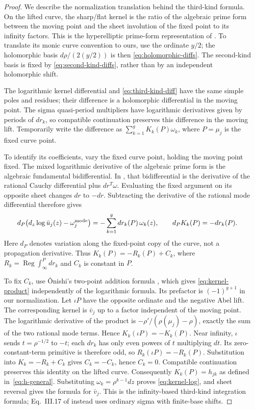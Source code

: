 \documentclass[11pt]{article}
\newcommand{\Reg}{\operatorname{Reg}}
\begin{document}
\begin{proof}
We describe the normalization translation behind the third-kind formula. On the lifted curve, the sharp/flat kernel is the ratio of the algebraic prime form between the moving point and the sheet involution of the fixed point to its infinity factors. This is the hyperelliptic prime-form representation of \cite[Theorem~7.17]{primeform}. To translate its monic curve convention to ours, use the ordinate $y/2$; the holomorphic basis $d\rho/(2(y/2))$ is then \eqref{eq:holomorphic-diffs}. The second-kind basis is fixed by \eqref{eq:second-kind-diffs}, rather than by an independent holomorphic shift.

The logarithmic kernel differential and \eqref{eq:third-kind-diff} have the same simple poles and residues; their difference is a holomorphic differential in the moving point. The sigma quasi-period multipliers have logarithmic derivatives given by periods of $dr_k$, so compatible continuation preserves this difference in the moving lift. Temporarily write the difference as $\sum_{k=1}^{g} K_k(P)\omega_k$, where $P=\mu_j$ is the fixed curve point.

To identify its coefficients, vary the fixed curve point, holding the moving point fixed. The mixed logarithmic derivative of the algebraic prime form is the algebraic fundamental bidifferential. In \cite[Eq.~II.11]{thirdkind}, that bidifferential is the derivative of the rational Cauchy differential plus $dr^T\omega$. Evaluating the fixed argument on its opposite sheet changes $dr$ to $-dr$. Subtracting the derivative of the rational mode differential therefore gives
\[
d_P\bigl(d_z\log\bar u_j(z)-\omega_j^{\rm mode}\bigr)
=-\sum_{k=1}^{g} dr_k(P)\,\omega_k(z),
\qquad d_P K_k(P)=-dr_k(P).
\]
Here $d_P$ denotes variation along the fixed-point copy of the curve, not a propagation derivative. Thus $K_k(P)=-R_k(P)+C_k$, where $R_k=\Reg\int_\infty^P dr_k$ and $C_k$ is constant in $P$.

To fix $C_k$, use \^Onishi's two-point addition formula \cite[Lemma~7.1]{onishi}, which gives \eqref{eq:kernel-product} independently of the logarithmic formula. Its prefactor is $(-1)^{g+1}$ in our normalization. Let $\iota P$ have the opposite ordinate and the negative Abel lift. The corresponding kernel is $\bar v_j$ up to a factor independent of the moving point. The logarithmic derivative of the product is $-\rho'/(\rho(\mu_j)-\rho)$, exactly the sum of the two rational mode terms. Hence $K_k(\iota P)=-K_k(P)$. Near infinity, $\iota$ sends $t=\rho^{-1/2}$ to $-t$; each $dr_k$ has only even powers of $t$ multiplying $dt$. Its zero-constant-term primitive is therefore odd, so $R_k(\iota P)=-R_k(P)$. Substitution into $K_k=-R_k+C_k$ gives $C_k=-C_k$, hence $C_k=0$. Compatible continuation preserves this identity on the lifted curve. Consequently $K_k(P)=h_{jk}$ as defined in~\eqref{eq:h-general}. Substituting $\omega_k=\rho^{k-1}dz$ proves \eqref{eq:kernel-log}, and sheet reversal gives the formula for $\bar v_j$. This is the infinity-based third-kind integration formula; Eq.~III.17 of \cite{thirdkind} instead uses ordinary sigma with finite-base shifts.


\end{proof}
\end{document}
